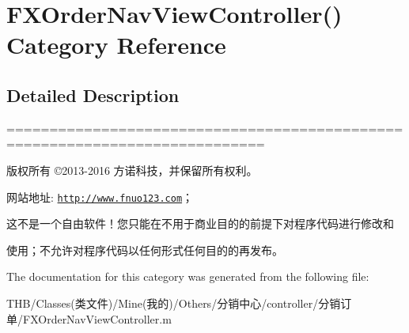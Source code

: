 \hypertarget{category_f_x_order_nav_view_controller_07_08}{}\section{F\+X\+Order\+Nav\+View\+Controller() Category Reference}
\label{category_f_x_order_nav_view_controller_07_08}


\subsection{Detailed Description}
============================================================================

版权所有 ©2013-\/2016 方诺科技，并保留所有权利。

网站地址\+: \href{http://www.fnuo123.com}{\tt http\+://www.\+fnuo123.\+com}； 



这不是一个自由软件！您只能在不用于商业目的的前提下对程序代码进行修改和

使用；不允许对程序代码以任何形式任何目的的再发布。 

 

The documentation for this category was generated from the following file\+:\begin{DoxyCompactItemize}
\item 
T\+H\+B/\+Classes(类文件)/\+Mine(我的)/\+Others/分销中心/controller/分销订单/F\+X\+Order\+Nav\+View\+Controller.\+m\end{DoxyCompactItemize}
